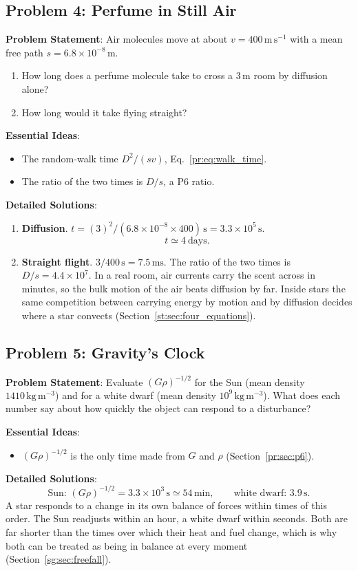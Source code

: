 \subsection{Problem 4: Perfume in Still Air}
\label{pr:prob:perfume}

\textbf{Problem Statement}: Air molecules move at about $v=400\,\mathrm{m\,s^{-1}}$ with a mean free path $s=6.8\times10^{-8}\,\mathrm m$.
\begin{enumerate}[label=(\alph*)]
	\item How long does a perfume molecule take to cross a $3\,\mathrm m$ room by diffusion alone?
	\item How long would it take flying straight?
\end{enumerate}

\textbf{Essential Ideas}:
\begin{itemize}
	\item The random-walk time $D^2/(sv)$, Eq.~\eqref{pr:eq:walk_time}.
	\item The ratio of the two times is $D/s$, a P6 ratio.
\end{itemize}

\textbf{Detailed Solutions}:
\begin{enumerate}[label=(\alph*)]
	\item \textbf{Diffusion}. $t=(3)^2/(6.8\times10^{-8}\times400)\,\mathrm s=3.3\times10^5\,\mathrm s$.
	\[
	\boxed{t\simeq4\ \text{days}.}
	\]
	\item \textbf{Straight flight}. $3/400\,\mathrm s=7.5\,\mathrm{ms}$. The ratio of the two times is $D/s=4.4\times10^7$. In a real room, air currents carry the scent across in minutes, so the bulk motion of the air beats diffusion by far. Inside stars the same competition between carrying energy by motion and by diffusion decides where a star convects (Section~\ref{st:sec:four_equations}).
\end{enumerate}

\subsection{Problem 5: Gravity's Clock}
\label{pr:prob:clock}

\textbf{Problem Statement}: Evaluate $(G\rho)^{-1/2}$ for the Sun (mean density $1410\,\mathrm{kg\,m^{-3}}$) and for a white dwarf (mean density $10^9\,\mathrm{kg\,m^{-3}}$). What does each number say about how quickly the object can respond to a disturbance?

\textbf{Essential Ideas}:
\begin{itemize}
	\item $(G\rho)^{-1/2}$ is the only time made from $G$ and $\rho$ (Section~\ref{pr:sec:p6}).
\end{itemize}

\textbf{Detailed Solutions}:
\[
\boxed{\text{Sun: }(G\rho)^{-1/2}=3.3\times10^3\,\mathrm s\simeq54\,\mathrm{min},\qquad\text{white dwarf: }3.9\,\mathrm s.}
\]
A star responds to a change in its own balance of forces within times of this order. The Sun readjusts within an hour, a white dwarf within seconds. Both are far shorter than the times over which their heat and fuel change, which is why both can be treated as being in balance at every moment (Section~\ref{sg:sec:freefall}).
